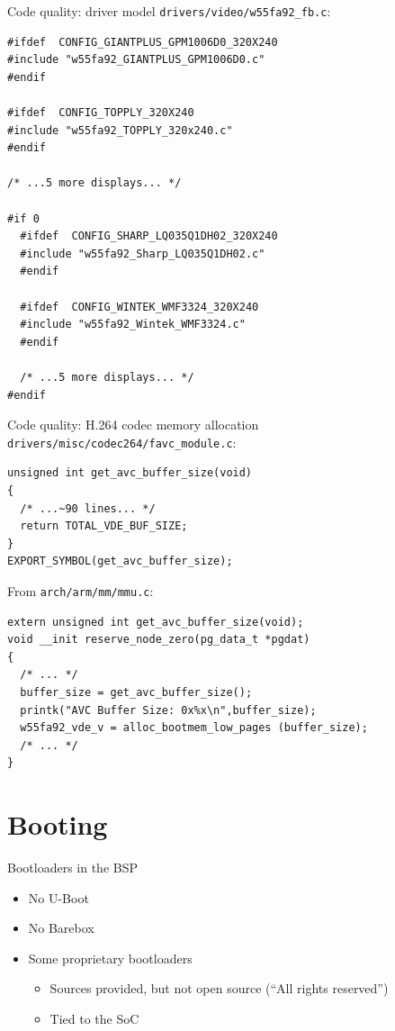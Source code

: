 \documentclass[xetex,table,aspectratio=169]{beamer}
\begin{document}
\begin{frame}[fragile]{Code quality: driver model}
  \texttt{drivers/video/w55fa92\_fb.c}:

  \linespread{0.9}
  \begin{verbatim}
#ifdef  CONFIG_GIANTPLUS_GPM1006D0_320X240
#include "w55fa92_GIANTPLUS_GPM1006D0.c"
#endif

#ifdef  CONFIG_TOPPLY_320X240
#include "w55fa92_TOPPLY_320x240.c"
#endif

/* ...5 more displays... */

#if 0
  #ifdef  CONFIG_SHARP_LQ035Q1DH02_320X240
  #include "w55fa92_Sharp_LQ035Q1DH02.c"
  #endif

  #ifdef  CONFIG_WINTEK_WMF3324_320X240
  #include "w55fa92_Wintek_WMF3324.c"
  #endif

  /* ...5 more displays... */
#endif
  \end{verbatim}
\end{frame}

\begin{frame}[fragile]{Code quality: H.264 codec memory allocation}
  \linespread{1}
  \texttt{drivers/misc/codec264/favc\_module.c}:

  \begin{verbatim}
unsigned int get_avc_buffer_size(void)
{
  /* ...~90 lines... */
  return TOTAL_VDE_BUF_SIZE;
}
EXPORT_SYMBOL(get_avc_buffer_size);
  \end{verbatim}

  From {\small\texttt{arch/arm/mm/mmu.c}}:
  \begin{verbatim}
extern unsigned int get_avc_buffer_size(void);
void __init reserve_node_zero(pg_data_t *pgdat)
{
  /* ... */
  buffer_size = get_avc_buffer_size();
  printk("AVC Buffer Size: 0x%x\n",buffer_size);
  w55fa92_vde_v = alloc_bootmem_low_pages (buffer_size);
  /* ... */
}
  \end{verbatim}
\end{frame}

\section{Booting}

\begin{frame}{Bootloaders in the BSP}
  \begin{itemize}
  \item No U-Boot
  \item No Barebox
  \item Some proprietary bootloaders
    \begin{itemize}
    \item Sources provided, but not open source (``All rights reserved'')
    \item Tied to the SoC
    \end{itemize}
  \end{itemize}
\end{frame}
\end{document}
